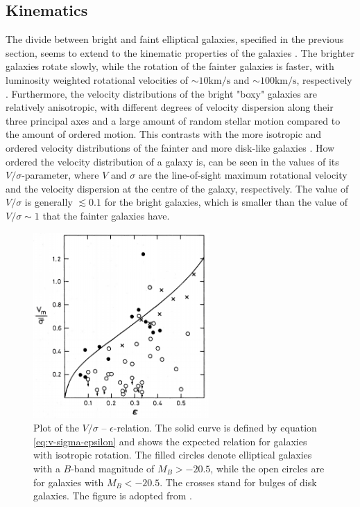 \documentclass[english, twoside]{HYgradu}
\begin{document}
\subsection{Kinematics} \label{section:ellip_kinematics}

The divide between bright and faint elliptical galaxies, specified in the previous section, seems to extend to the kinematic properties of the galaxies \citep[discussed in e.g.][]{GalaxyFormationAndEvo2010}. The brighter galaxies rotate slowly, while the rotation of the fainter galaxies is faster, with luminosity weighted rotational velocities of $\sim 10 \mathrm{km/s}$ and $\sim 100 \mathrm{km/s}$, respectively \citep{Davies1983, Cappellari2007}. Furthermore, the velocity distributions of the bright "boxy" galaxies are relatively anisotropic, with different degrees of velocity dispersion along their three principal axes and a large amount of random stellar motion compared to the amount of ordered motion. This contrasts with the more isotropic and ordered velocity distributions of the fainter and more disk-like galaxies \citep{Kormendy2009, Krajnovic2008}. How ordered the velocity distribution of a galaxy is, can be seen in the values of its $V/\sigma$-parameter, where $V$ and $\sigma$ are the line-of-sight maximum rotational velocity and the velocity dispersion at the centre of the galaxy, respectively. The value of $V/\sigma$ is generally $\lesssim 0.1$ for the bright galaxies, which is smaller than the value of $V/\sigma \sim 1$ that the fainter galaxies have.

\begin{figure}[h]
	\centering
	\includegraphics[width=0.60\textwidth]{davies_v-sigma.png}
	\caption{Plot of the $V/\sigma$ – $\epsilon$-relation. The solid curve is defined by equation \ref{eq:v-sigma-epsilon} and shows the expected relation for galaxies with isotropic rotation. The filled circles denote elliptical galaxies with a $B$-band magnitude of $M_B > -20.5$, while the open circles are for galaxies with $M_B < -20.5$. The crosses stand for bulges of disk galaxies. The figure is adopted from \cite{Davies1983}.}
	\label{figure:v-sigma}
\end{figure}
\end{document}
